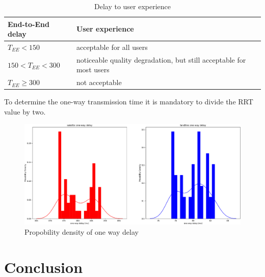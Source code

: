 \documentclass[parskip=full]{scrartcl}
\begin{document}
\begin{table}[hb]
	\centering
	\begin{tabular}{ll}
		\toprule
		\textbf{End-to-End delay} & \textbf{User experience} \\ \midrule
			$T_{EE} < 150$ & acceptable for all users \\
			$150 < T_{EE} < 300$ & noticeable quality degradation, but still acceptable for most users\\
			$T_{EE} \geq 300$ & not acceptable\\
			\bottomrule
		\end{tabular}
		\caption{Delay to user experience}
		\label{tab:delayEnd2End}
	\end{table}
	
To determine the one-way transmission time it is mandatory to divide the RRT value by two.

\begin{figure}[!ht]
	\centering %
	\includegraphics[width=\textwidth]{images/oneWayDelay.pdf} %
	\caption{Propobility density of one way delay} 
	\label{fig:one-way-delay} %
\end{figure}



\newpage
\section{Conclusion}


\printbibliography
\end{document}
